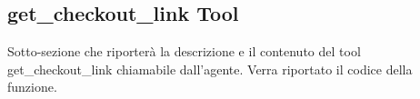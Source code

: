\subsection{get\_checkout\_link Tool}

Sotto-sezione che riporterà la descrizione e il contenuto del tool get\_checkout\_link chiamabile dall'agente.
Verra riportato il codice della funzione.

